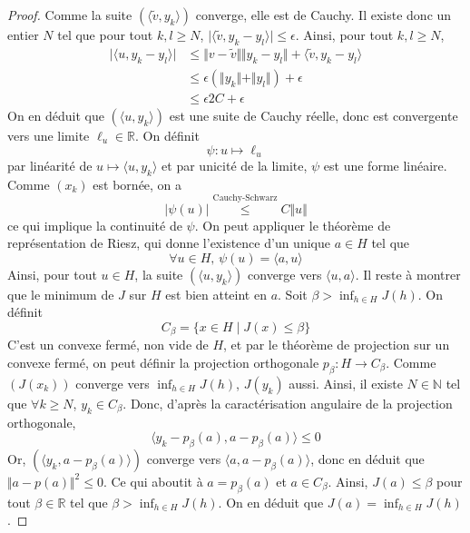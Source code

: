 \begin{proof}
    Comme la suite $(\langle \widetilde{v}, y_k \rangle)$ converge, elle est de Cauchy. Il existe donc un entier $N$ tel que pour tout $k, l \geq N$, $\vert \langle \widetilde{v}, y_k - y_l \rangle \vert \leq \epsilon$. Ainsi, pour tout $k, l \geq N$,
    \begin{align*}
      \vert \langle u, y_k - y_l \rangle \vert &\leq \Vert v - \widetilde{v} \Vert \Vert y_k - y_l \Vert + \langle \widetilde{v}, y_k - y_l \rangle \\
      &\leq \epsilon (\Vert y_k \Vert + \Vert y_l \Vert) + \epsilon \\
      &\leq \epsilon 2 C + \epsilon
    \end{align*}
    On en déduit que $(\langle u, y_k \rangle)$ est une suite de Cauchy réelle, donc est convergente vers une limite $\ell_u \in \mathbb{R}$. On définit
    \[ \psi : u \mapsto \ell_u \]
    par linéarité de $u \mapsto \langle u, y_k \rangle$ et par unicité de la limite, $\psi$ est une forme linéaire. Comme $(x_k)$ est bornée, on a
    \[ \vert \psi(u) \vert \overset{\text{Cauchy-Schwarz}}{\leq} C \Vert u \Vert \]
    ce qui implique la continuité de $\psi$. On peut appliquer le théorème de représentation de Riesz, qui donne l'existence d'un unique $a \in H$ tel que
    \[ \forall u \in H, \, \psi(u) = \langle a, u \rangle \]
    Ainsi, pour tout $u \in H$, la suite $(\langle u, y_k \rangle)$ converge vers $\langle u, a \rangle$.
    \newpar
    Il reste à montrer que le minimum de $J$ sur $H$ est bien atteint en $a$. Soit $\beta > \inf_{h \in H} J(h)$. On définit
    \[ C_\beta = \{ x \in H \mid J(x) \leq \beta \} \]
    C'est un convexe fermé, non vide de $H$, et par le théorème de projection sur un convexe fermé, on peut définir la projection orthogonale $p_\beta : H \rightarrow C_\beta$. Comme $(J(x_k))$ converge vers $\inf_{h \in H} J(h)$, $J(y_k)$ aussi. Ainsi, il existe $N \in \mathbb{N}$ tel que $\forall k \geq N$, $y_k \in C_\beta$. Donc, d'après la caractérisation angulaire de la projection orthogonale,
    \[ \langle y_k - p_\beta(a), a - p_\beta(a) \rangle \leq 0 \]
    Or, $(\langle y_k, a -p_\beta(a) \rangle)$ converge vers $\langle a, a - p_\beta(a) \rangle$, donc en déduit que $\Vert a - p(a) \Vert^2 \leq 0$. Ce qui aboutit à $a = p_\beta(a)$ et $a \in C_\beta$. Ainsi, $J(a) \leq \beta$ pour tout $\beta \in \mathbb{R}$ tel que $\beta > \inf_{h \in H} J(h)$. On en déduit que $J(a) = \inf_{h \in H} J(h)$.
  \end{proof}

